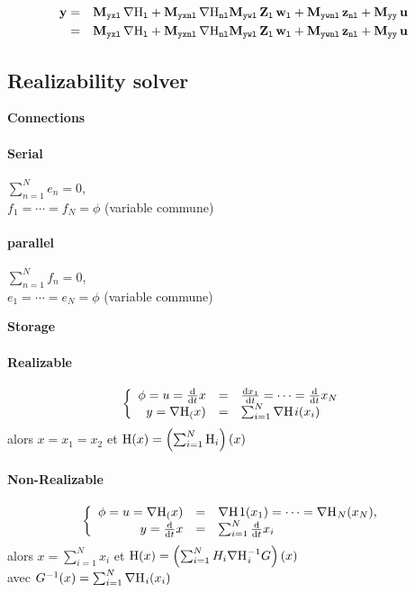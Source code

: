 \documentclass[10pt,a4paper]{article}
\begin{document}
\begin{eqnarray}
\vy & = &\M{yxl}\,\nabla \Hl + \M{yxnl}\,\nabla \Hnl\M{ywl}\,\mat Z_{\lab l}\,\vwl + \M{ywnl}\,\vznl + \M{yy}\,\vu\\
&=& \M{yxl}\,\nabla \Hl + \M{yxnl}\,\nabla \Hnl\M{ywl}\,\mat Z_{\lab l}\,\vwl + \M{ywnl}\,\vznl + \M{yy}\,\vu\\
\end{eqnarray}

\subsection{Realizability solver}
%
\textbf{Connections\\}
\paragraph{Serial}
$\sum_{n=1}^N e_n = 0$, \\
$f_1 = \cdots = f_N = \phi$ (variable commune)
\paragraph{parallel}
$\sum_{n=1}^N f_n = 0$,\\
 $e_1 = \cdots = e_N = \phi$ (variable commune)

\textbf{Storage}
\paragraph{Realizable}
$$\left\{ \begin{array}{rcl}
\phi = u =\D{}{t} x &=& \D{x_1}{t} =\cdots = \D{}{t}{x_N} \\
y = \dxH(x)&=& \sum_{i=1}^N\dxH{}{}_{}i(x_i) \end{array}\right.$$
alors $ x = x_1 = x_2 $ et $\H(x) = \left(\sum_{i=1}^N \H_i\right)(x)$
\paragraph{Non-Realizable}
$$\left\{ \begin{array}{rcl}
\phi = u =\dxH (x)& =& \dxH{}{}_{}{}1(x_1) =\cdots = \dxH{}{}_N(x_N),\\
y=  \D{}{t}{x} & =& \sum_{i=1}^N \D{}{t}{x_i} \end{array}\right.$$
alors $ x =\sum_{i=1}^N x_i $ et $\H(x) = \left(\sum_{i=1}^N H_i \dxH{}{}_i^{-1} G \right) (x) $ \\
avec $G^{-1}(x) = \sum_{i=1}^N\dxH{}{}_i(x_i)$
\end{document}

